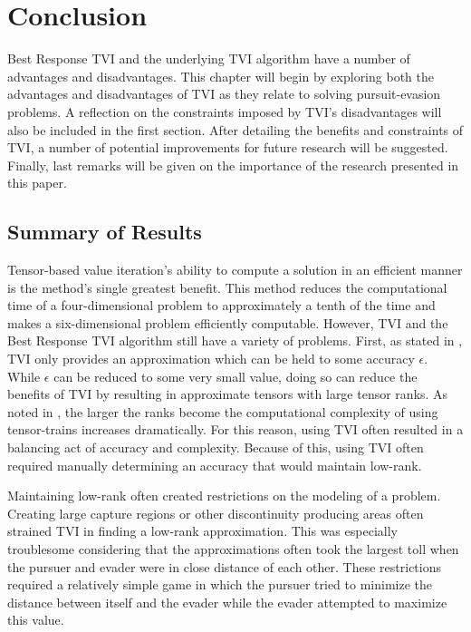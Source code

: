 \chapter{Conclusion}\label{chp:con}
Best Response TVI and the underlying TVI algorithm have a number of advantages and disadvantages. This chapter will begin by exploring both the advantages and disadvantages of TVI as they relate to solving pursuit-evasion problems. A reflection on the constraints imposed by TVI's disadvantages will also be included in the first section. After detailing the benefits and constraints of TVI, a number of potential improvements for future research will be suggested. Finally, last remarks will be given on the importance of the research presented in this paper.  

\section{Summary of Results}
Tensor-based value iteration's ability to compute a solution in an efficient manner is the method's single greatest benefit. This method reduces the computational time of a four-dimensional problem to approximately a tenth of the time and makes a six-dimensional problem efficiently computable. However, TVI and the Best Response TVI algorithm still have a variety of problems. First, as stated in , TVI only provides an approximation which can be held to some accuracy $\epsilon$. While $\epsilon$ can be reduced to some very small value, doing so can reduce the benefits of TVI by resulting in approximate tensors with large tensor ranks. As noted in , the larger the ranks become the computational complexity of using tensor-trains increases dramatically. For this reason, using TVI often resulted in a balancing act of accuracy and complexity. Because of this, using TVI often required manually determining an accuracy that would maintain low-rank.

Maintaining low-rank often created restrictions on the modeling of a problem. Creating large capture regions or other discontinuity producing areas often strained TVI in finding a low-rank approximation. This was especially troublesome considering that the approximations often took the largest toll when the pursuer and evader were in close distance of each other. These restrictions required a relatively simple game in which the pursuer tried to minimize the distance between itself and the evader while the evader attempted to maximize this value.

